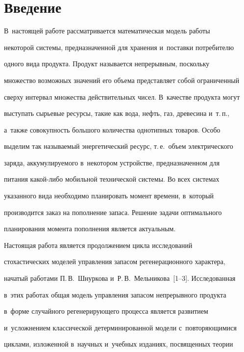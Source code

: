  

\section{Введение}



  В~настоящей работе рассматривается математическая модель работы 

некоторой системы, предназначенной для хранения и~поставки потребителю 

одного вида продукта. Продукт называется непрерывным, поскольку 

множество возможных значений его объема представляет собой ограниченный 

сверху интервал множества действительных чисел. В~качестве продукта могут 

выступать сырьевые ресурсы, такие как вода, нефть, газ, древесина и~т.\,п., 

а~также совокупность большого количества однотипных товаров. Особо 

выделим так называемый энергетический ресурс, т.\,е.\ объем электрического 

заряда, аккумулируемого в~некотором устройстве, предназначенном для 

питания ка\-кой-ли\-бо мобильной технической системы. Во всех системах 

указанного вида необходимо планировать момент времени, в~который 

производится заказ на пополнение запаса. Решение задачи оптимального 

планирования момента пополнения является ак\-ту\-аль\-ным.

{



}

  

  Настоящая работа является продолжением цикла исследований 

стохастических моделей управления запасом регенерационного характера, 

начатый работами П.\,В.~Шнуркова и~Р.\,В.~Мельникова~[1--3]. Исследованная 

в~этих работах общая модель управления запасом непрерывного продукта 

в~форме случайного регенерирующего процесса является развитием 

и~усложнением классической детерминированной модели с~повторяющимися 

циклами, изложенной в~научных и~учебных изданиях, посвященных теории 

